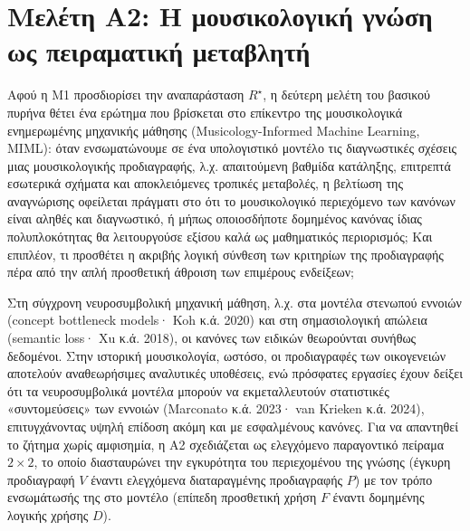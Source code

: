 \documentclass[11pt,a4paper]{article}
\newcommand{\Rs}{R^{\star}}
\begin{document}
\section{Μελέτη Α2: Η μουσικολογική γνώση ως πειραματική μεταβλητή}

Αφού η Μ1 προσδιορίσει την αναπαράσταση $\Rs$, η δεύτερη μελέτη του βασικού πυρήνα θέτει ένα ερώτημα που βρίσκεται στο επίκεντρο της μουσικολογικά ενημερωμένης μηχανικής μάθησης (Musicology-Informed Machine Learning, MIML): όταν ενσωματώνουμε σε ένα υπολογιστικό μοντέλο τις διαγνωστικές σχέσεις μιας μουσικολογικής προδιαγραφής, λ.χ. απαιτούμενη βαθμίδα κατάληξης, επιτρεπτά εσωτερικά σχήματα και αποκλειόμενες τροπικές μεταβολές, η βελτίωση της αναγνώρισης οφείλεται πράγματι στο ότι το μουσικολογικό περιεχόμενο των κανόνων είναι αληθές και διαγνωστικό, ή μήπως οποιοσδήποτε δομημένος κανόνας ίδιας πολυπλοκότητας θα λειτουργούσε εξίσου καλά ως μαθηματικός περιορισμός; Και επιπλέον, τι προσθέτει η ακριβής λογική σύνθεση των κριτηρίων της προδιαγραφής πέρα από την απλή προσθετική άθροιση των επιμέρους ενδείξεων;

Στη σύγχρονη νευροσυμβολική μηχανική μάθηση, λ.χ. στα μοντέλα στενωπού εννοιών (concept bottleneck models· Koh κ.ά. 2020) και στη σημασιολογική απώλεια (semantic loss· Xu κ.ά. 2018), οι κανόνες των ειδικών θεωρούνται συνήθως δεδομένοι. Στην ιστορική μουσικολογία, ωστόσο, οι προδιαγραφές των οικογενειών αποτελούν αναθεωρήσιμες αναλυτικές υποθέσεις, ενώ πρόσφατες εργασίες έχουν δείξει ότι τα νευροσυμβολικά μοντέλα μπορούν να εκμεταλλευτούν στατιστικές «συντομεύσεις» των εννοιών (Marconato κ.ά. 2023· van Krieken κ.ά. 2024), επιτυγχάνοντας υψηλή επίδοση ακόμη και με εσφαλμένους κανόνες. Για να απαντηθεί το ζήτημα χωρίς αμφισημία, η Α2 σχεδιάζεται ως ελεγχόμενο παραγοντικό πείραμα $2\times2$, το οποίο διασταυρώνει την εγκυρότητα του περιεχομένου της γνώσης (έγκυρη προδιαγραφή $V$ έναντι ελεγχόμενα διαταραγμένης προδιαγραφής $P$) με τον τρόπο ενσωμάτωσής της στο μοντέλο (επίπεδη προσθετική χρήση $F$ έναντι δομημένης λογικής χρήσης $D$).
\end{document}
